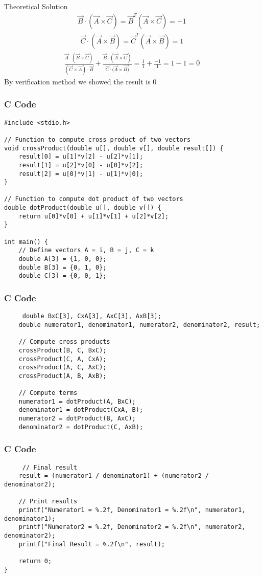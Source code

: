 \documentclass{beamer}
\begin{document}
\begin{frame}{Theoretical Solution}
\begin{align}
\vec{B} \cdot(\vec{A}\times \vec{C})=\vec{B}^T(\vec{A}\times \vec{C})=-1\
\end{align}
\begin{align}
 \vec{C} \cdot (\vec{A} \times \vec{B})= \vec{C}^T (\vec{A} \times \vec{B})=1\ 
\end{align}
\begin{align}
\frac{\vec{A} \cdot(\vec{B}\times\vec{C})}{(\vec{C} \times \vec{A}) \cdot \vec{B}}
+ \frac{\vec{B} \cdot(\vec{A}\times \vec{C})}{\vec{C} \cdot (\vec{A} \times \vec{B)}}
= \frac{1}{1}+\frac{-1}{1}=1-1=0\
\end{align}
By verification method we showed the result is 0
\end{frame}
\begin{frame}[fragile]
    \frametitle{C Code}
    \begin{lstlisting}
#include <stdio.h>

// Function to compute cross product of two vectors
void crossProduct(double u[], double v[], double result[]) {
    result[0] = u[1]*v[2] - u[2]*v[1];
    result[1] = u[2]*v[0] - u[0]*v[2];
    result[2] = u[0]*v[1] - u[1]*v[0];
}

// Function to compute dot product of two vectors
double dotProduct(double u[], double v[]) {
    return u[0]*v[0] + u[1]*v[1] + u[2]*v[2];
}

int main() {
    // Define vectors A = i, B = j, C = k
    double A[3] = {1, 0, 0};
    double B[3] = {0, 1, 0};
    double C[3] = {0, 0, 1};
     \end{lstlisting}
\end{frame}
\begin{frame}[fragile]
    \frametitle{C Code }
    \begin{lstlisting}
     double BxC[3], CxA[3], AxC[3], AxB[3];
    double numerator1, denominator1, numerator2, denominator2, result;

    // Compute cross products
    crossProduct(B, C, BxC);
    crossProduct(C, A, CxA);
    crossProduct(A, C, AxC);
    crossProduct(A, B, AxB);

    // Compute terms
    numerator1 = dotProduct(A, BxC);
    denominator1 = dotProduct(CxA, B);
    numerator2 = dotProduct(B, AxC);
    denominator2 = dotProduct(C, AxB);
\end{lstlisting}
\end{frame}
\begin{frame}[fragile]
    \frametitle{C Code }
    \begin{lstlisting}
     // Final result
    result = (numerator1 / denominator1) + (numerator2 / denominator2);

    // Print results
    printf("Numerator1 = %.2f, Denominator1 = %.2f\n", numerator1, denominator1);
    printf("Numerator2 = %.2f, Denominator2 = %.2f\n", numerator2, denominator2);
    printf("Final Result = %.2f\n", result);

    return 0;
}
    \end{lstlisting}
\end{frame}
\end{document}

